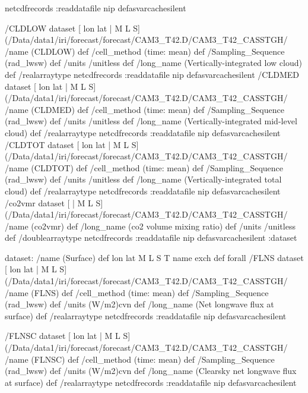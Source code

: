 \begin{ingrid}
{netcdfrecords 
:readdatafile
nip
}defasvarcachesilent

 /CLDLOW{
dataset
[ lon lat | M L S] (/Data/data1/iri/forecast/forecast/CAM3_T42.D/CAM3_T42_CASSTGH/%
/name (CLDLOW) def
 /cell_method (time: mean) def
 /Sampling_Sequence (rad_lwsw) def
 /units /unitless def
 /long_name (Vertically-integrated low cloud) def
 /realarraytype netcdfrecords :readdatafile
nip
}defasvarcachesilent
 /CLDMED{
dataset
[ lon lat | M L S] (/Data/data1/iri/forecast/forecast/CAM3_T42.D/CAM3_T42_CASSTGH/%
/name (CLDMED) def
 /cell_method (time: mean) def
 /Sampling_Sequence (rad_lwsw) def
 /units /unitless def
 /long_name (Vertically-integrated mid-level cloud) def
 /realarraytype netcdfrecords :readdatafile
nip
}defasvarcachesilent
 /CLDTOT{
dataset
[ lon lat | M L S] (/Data/data1/iri/forecast/forecast/CAM3_T42.D/CAM3_T42_CASSTGH/%
/name (CLDTOT) def
 /cell_method (time: mean) def
 /Sampling_Sequence (rad_lwsw) def
 /units /unitless def
 /long_name (Vertically-integrated total cloud) def
 /realarraytype netcdfrecords :readdatafile
nip
}defasvarcachesilent
 /co2vmr{
dataset
[ | M L S] (/Data/data1/iri/forecast/forecast/CAM3_T42.D/CAM3_T42_CASSTGH/%
/name (co2vmr) def
 /long_name (co2 volume mixing ratio) def
 /units /unitless def
 /doublearraytype netcdfrecords :readdatafile
nip
}defasvarcachesilent
:dataset 


dataset:
/name (Surface) def
{ lon lat M L S T } {name exch def} forall
 /FLNS{
dataset
[ lon lat | M L S] (/Data/data1/iri/forecast/forecast/CAM3_T42.D/CAM3_T42_CASSTGH/%
/name (FLNS) def
 /cell_method (time: mean) def
 /Sampling_Sequence (rad_lwsw) def
 /units (W/m2)cvn def
 /long_name (Net longwave flux at surface) def
 /realarraytype netcdfrecords :readdatafile
nip
}defasvarcachesilent

 /FLNSC{
dataset
[ lon lat | M L S] (/Data/data1/iri/forecast/forecast/CAM3_T42.D/CAM3_T42_CASSTGH/%
/name (FLNSC) def
 /cell_method (time: mean) def
 /Sampling_Sequence (rad_lwsw) def
 /units (W/m2)cvn def
 /long_name (Clearsky net longwave flux at surface) def
 /realarraytype netcdfrecords :readdatafile
nip
}defasvarcachesilent


\end{ingrid}
